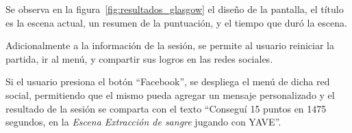 Se observa en la figura~\ref{fig:resultados_glasgow} el diseño de la
pantalla, el título es la escena actual, un resumen de la
puntuación, y el tiempo que duró la escena.


Adicionalmente a la información de la sesión, se permite al usuario reiniciar la
partida, ir al menú, y compartir sus logros en las redes sociales.

Si el usuario presiona el botón \enquote{Facebook}, se despliega el menú de
dicha red social, permitiendo que el mismo pueda agregar un mensaje
personalizado y el resultado de la sesión se comparta con el texto \enquote{Conseguí 15 puntos
    en 1475 segundos, en la \emph{Escena Extracción de sangre} jugando con
    YAVE}.

